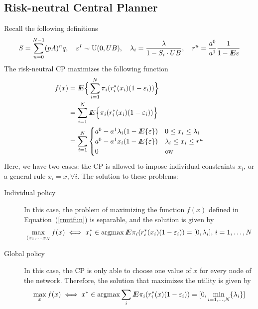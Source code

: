 \subsection{Risk-neutral Central Planner}
Recall the following definitions
\[S=\sum_{n=0}^{N-1}(pA)^nq,\quad \varepsilon^I\sim{\rm U}(0,UB),\quad \lambda_i=\frac{\lambda}{1-S_i\cdot UB}, \quad r^u=\frac{a^0}{a^1}\frac{1}{1-{I\kern-.35em E}\varepsilon}\]
The risk-neutral CP maximizes the following function
\begin{equation}\label{rnutfun}
\begin{align}
f(x)&={I\kern-.35em E}\Big\lbrace \sum_{i=1}^N \pi_i(r^*_i(x_i)(1-\varepsilon_i))\Big\rbrace\\
&=\sum_{i=1}^N {I\kern-.35em E}\Big\lbrace\pi_i(r^*_i(x_i)(1-\varepsilon_i))\Big\rbrace\\
&=\sum_{i=1}^N \begin{cases}
a^0-a^1\lambda_i(1-{I\kern-.35em E}\{\varepsilon\})&0\leq x_i\leq \lambda_i\\
a^0-a^1x_i(1-{I\kern-.35em E}\{\varepsilon\})&\lambda_i\leq x_i\leq r^u\\
0&{\rm ow}
\end{cases}
\end{align}
\end{equation}
Here, we have two cases: the CP is allowed to impose individual constraints $x_i$, or a general rule $x_i=x,\forall i$. The solution to these problems:
\begin{description}
\item[Individual policy] In this case, the problem of maximizing the function $f(x)$ defined in Equation~(\ref{rnutfun}) is separable, and the solution is given by
\begin{equation}\label{solrncpproind}
\max_{(x_1,\ldots,x_N} f(x)\iff x_i^*\in\mathop{\rm argmax} {I\kern-.35em E}\pi_i(r^*_i(x_i)(1-\varepsilon_i))=[0,\lambda_i],\,i=1,\ldots,N
\end{equation}

\item[Global policy] In this case, the CP is only able to choose one value of $x$ for every node of the network.  Therefore, the solution that maximizes the utility is given by
\begin{equation}\label{solrncpproglo}
\max_{x} f(x)\iff x^*\in\mathop{\rm argmax} \sum_i{I\kern-.35em E}\pi_i(r^*_i(x)(1-\varepsilon_i))=[0,\min_{i=1,\ldots,N}\{\lambda_i\}]
\end{equation}
\end{description}
